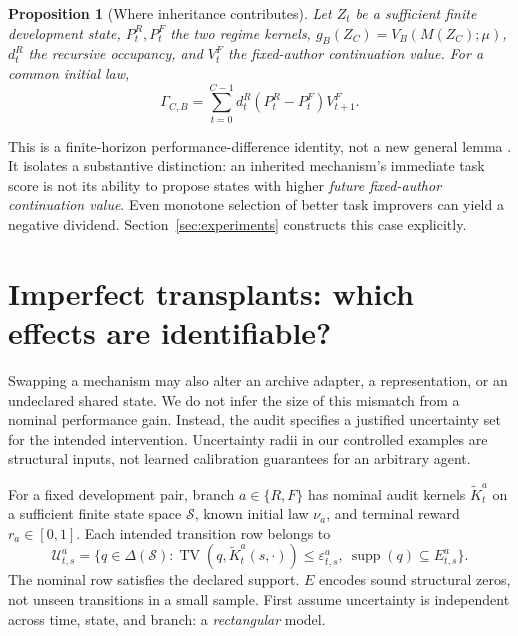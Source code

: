 \documentclass{article}
\newtheorem{proposition}[theorem]{Proposition}
\theoremstyle{definition}
\newcommand{\TV}{\operatorname{TV}}
\newcommand{\eps}{\varepsilon}
\newcommand{\cU}{\mathcal U}
\newcommand{\cS}{\mathcal S}
\begin{document}
\begin{proposition}[Where inheritance contributes]\label{prop:decomp}
Let $Z_t$ be a sufficient finite development state, $P_t^R,P_t^F$ the two regime kernels, $g_B(Z_C)=V_B(M(Z_C);\mu)$, $d_t^R$ the recursive occupancy, and $V_t^F$ the fixed-author continuation value. For a common initial law,
\begin{equation}
 \Gamma_{C,B}=\sum_{t=0}^{C-1} d_t^R(P_t^R-P_t^F)V_{t+1}^F.\label{eq:decomposition}
\end{equation}
\end{proposition}
This is a finite-horizon performance-difference identity, not a new general lemma \citep{trpo}. It isolates a substantive distinction: an inherited mechanism's immediate task score is not its ability to propose states with higher \emph{future fixed-author continuation value}. Even monotone selection of better task improvers can yield a negative dividend. Section~\ref{sec:experiments} constructs this case explicitly.

\section{Imperfect transplants: which effects are identifiable?}\label{sec:robust}
Swapping a mechanism may also alter an archive adapter, a representation, or an undeclared shared state. We do not infer the size of this mismatch from a nominal performance gain. Instead, the audit specifies a justified uncertainty set for the intended intervention. Uncertainty radii in our controlled examples are structural inputs, not learned calibration guarantees for an arbitrary agent.

For a fixed development pair, branch $a\in\{R,F\}$ has nominal audit kernels $\widetilde K_t^a$ on a sufficient finite state space $\cS$, known initial law $\nu_a$, and terminal reward $r_a\in[0,1]$. Each intended transition row belongs to
\begin{equation}
 \cU_{t,s}^a=\{q\in\Delta(\cS):\TV(q,\widetilde K_t^a(s,\cdot))\leq\eps_{t,s}^a,
 \ \operatorname{supp}(q)\subseteq E_{t,s}^a\}.\label{eq:uncertainty}
\end{equation}
The nominal row satisfies the declared support. $E$ encodes sound structural zeros, not unseen transitions in a small sample. First assume uncertainty is independent across time, state, and branch: a \emph{rectangular} model.
\end{document}
